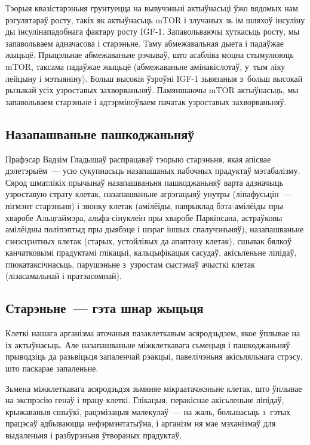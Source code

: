 Тэорыя квазістарэньня грунтуецца на вывучэньні актыўнасьці ўжо вядомых нам рэгулятараў росту, такіх як актыўнасьць mTOR і злучаных зь ім шляхоў інсуліну ды інсулінападобнага фактару росту IGF-1. Запавольваючы хуткасьць росту, мы запавольваем адначасова і старэньне. Таму абмежавальная дыета і падаўжае жыцьцё. Прыцэльнае абмежаваньне рэчываў, што асабліва моцна стымулююць mTOR, таксама падаўжае жыцьцё (абмежаваньне амінакіслотаў, у~тым ліку лейцыну і мэтыяніну). Больш высокія ўзроўні IGF-1 зьвязаныя з~больш высокай рызыкай усіх узроставых захворваньняў. Памяншаючы mTOR актыўнасьць, мы запавольваем старэньне і адтэрміноўваем пачатак узроставых захворваньняў.

\subsection*{Назапашваньне пашкоджаньняў}

Прафэсар Вадзім Гладышаў распрацаваў тэорыю старэньня, якая апісвае дэлетэрыём~--- усю сукупнасьць назапашаных пабочных прадуктаў мэтабалізму. Сярод шматлікіх прычынаў назапашваньня пашкоджаньняў варта адзначыць узроставую страту клетак, назапашваньне агрэгацыяў унутры (ліпафусьцін~--- пігмэнт старэньня) і звонку клетак (амілёіды, напрыклад бэта-амілёіды пры хваробе Альцгаймэра, альфа-сінуклеін пры хваробе Паркінсана, астраўковы амілёідны поліпэптыд пры дыябэце і шэраг іншых спалучэньняў), назапашваньне сэнэсцэнтных клетак (старых, устойлівых да апаптозу клетак), сшывак бялкоў канчатковымі прадуктамі глікацыі, кальцыфікацыя сасудаў, акісьленьне ліпідаў, глюкатаксічнасьць, парушэньне з~узростам сыстэмаў ачысткі клетак (лізасамальнай і пратэасомнай).

\subsection*{Старэньне~--- гэта шнар жыцьця}

Клеткі нашага арганізма аточаныя пазаклеткавым асяродзьдзем, якое ўплывае на іх актыўнасьць. Але назапашваньне міжклеткавага сьмецьця і пашкоджаньняў прыводзіць да разьвіцьця запаленчай рэакцыі, павелічэньня акісьляльнага стрэсу, што паскарае запаленьне. 


Зьмена міжклеткавага асяродзьдзя зьмяняе мікраатачжэньне клетак, што ўплывае на экспрэсію генаў і працу клеткі. Глікацыя, перакіснае акісьленьне ліпідаў, крыжаваныя сшыўкі, рацэмізацыя малекулаў~--- на жаль, большасьць з~гэтых працэсаў адбываюцца нефэрмэнтатыўна, і арганізм ня мае мэханізмаў для выдаленьня і разбурэньня ўтвораных прадуктаў.

